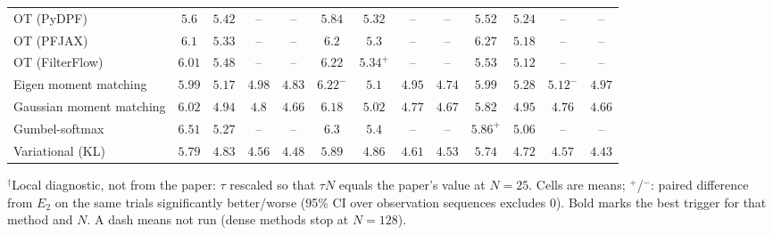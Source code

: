 \begin{table}[ht]
\begin{adjustbox}{max width=\linewidth}
\begin{tabular}{lcccc|cccc|cccc}
OT (PyDPF) & $5.6$ & $5.42$ & -- & -- & $5.84$ & $5.32$ & -- & -- & $\mathbf{5.52}$ & $\mathbf{5.24}$ & -- & -- \\
OT (PFJAX) & $\mathbf{6.1}$ & $5.33$ & -- & -- & $6.2$ & $5.3$ & -- & -- & $6.27$ & $\mathbf{5.18}$ & -- & -- \\
OT (FilterFlow) & $6.01$ & $5.48$ & -- & -- & $6.22$ & $5.34^{+}$ & -- & -- & $\mathbf{5.53}$ & $\mathbf{5.12}$ & -- & -- \\
Eigen moment matching & $\mathbf{5.99}$ & $5.17$ & $4.98$ & $4.83$ & $6.22^{-}$ & $\mathbf{5.1}$ & $\mathbf{4.95}$ & $\mathbf{4.74}$ & $5.99$ & $5.28$ & $5.12^{-}$ & $4.97$ \\
Gaussian moment matching & $6.02$ & $\mathbf{4.94}$ & $4.8$ & $\mathbf{4.66}$ & $6.18$ & $5.02$ & $4.77$ & $4.67$ & $\mathbf{5.82}$ & $4.95$ & $\mathbf{4.76}$ & $4.66$ \\
Gumbel-softmax & $6.51$ & $5.27$ & -- & -- & $6.3$ & $5.4$ & -- & -- & $\mathbf{5.86}^{+}$ & $\mathbf{5.06}$ & -- & -- \\
Variational (KL) & $5.79$ & $4.83$ & $\mathbf{4.56}$ & $4.48$ & $5.89$ & $4.86$ & $4.61$ & $4.53$ & $\mathbf{5.74}$ & $\mathbf{4.72}$ & $4.57$ & $\mathbf{4.43}$ \\
\bottomrule
\end{tabular}
\end{adjustbox}
\par\smallskip\parbox{0.95\linewidth}{\footnotesize $^\dagger$Local diagnostic, not from the paper: $\tau$ rescaled so that $\tau N$ equals the paper's value at $N{=}25$. Cells are means; $^{+}$/$^{-}$: paired difference from $E_2$ on the same trials significantly better/worse (95\% CI over observation sequences excludes 0). Bold marks the best trigger for that method and $N$. A dash means not run (dense methods stop at $N{=}128$).}
\end{table}

